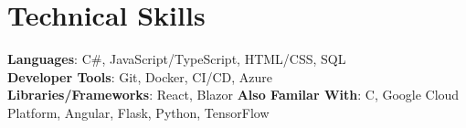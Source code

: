 \documentclass[letterpaper,11pt]{article}
\begin{document}
\section{Technical Skills}
 \begin{itemize}[leftmargin=0.15in, label={}]
    \small{\item{
     \textbf{Languages}{: C\#, JavaScript/TypeScript, HTML/CSS,  SQL } \\
     \textbf{Developer Tools}{: Git, Docker,  CI/CD, Azure } \\
     \textbf{Libraries/Frameworks}{: React, Blazor}}\newline
    \textbf{Also Familar With}{: C,  Google Cloud Platform, Angular, Flask, Python, TensorFlow }}
 \end{itemize}


\end{document}
